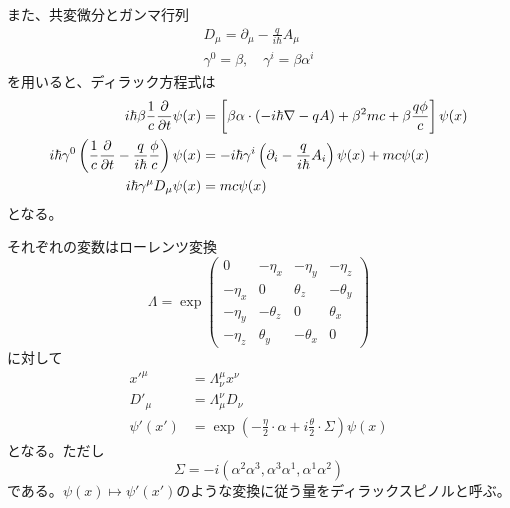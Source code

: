     また、共変微分とガンマ行列
    \begin{gather*}
        D_\mu = \partial_\mu - \frac{q}{i\hbar}A_\mu\\
        \gamma^0 = \beta, \quad \gamma^i = \beta\alpha^i
    \end{gather*}
    を用いると、ディラック方程式は
    \begin{align*}
        i\hbar\beta\frac{1}{c}\pdv{t}\psi(x) &= \left[\beta\alpha \cdot (-i\hbar\nabla - qA) + \beta^2 mc + \beta\frac{q\phi}{c}\right]\psi(x)\\
        i\hbar\gamma^0\left(\frac{1}{c}\pdv{t} - \frac{q}{i\hbar}\frac{\phi}{c}\right)\psi(x) &= -i\hbar\gamma^i \left(\partial_i - \frac{q}{i\hbar}A_i\right)\psi(x) + mc\psi(x)\\
        i\hbar \gamma^\mu D_\mu \psi(x) &= mc\psi(x)
    \end{align*}
    となる。

    それぞれの変数はローレンツ変換
        \[\Lambda = \exp \begin{pmatrix}
            0 & -\eta_x & -\eta_y & -\eta_z\\
            -\eta_x & 0 & \theta_z & -\theta_y\\
            -\eta_y & -\theta_z & 0 & \theta_x\\
            -\eta_z & \theta_y & -\theta_x & 0
        \end{pmatrix}\]
    に対して
    \begin{align*}
        x'^\mu &= \Lambda^\mu_\nu x^\nu\\
        D'_\mu &= \Lambda_\mu^\nu D_\nu\\
        \psi'(x') &= \exp\left(-\frac{\eta}{2} \cdot \alpha + i\frac{\theta}{2} \cdot \Sigma\right)\psi(x)
    \end{align*}
    となる。ただし
        \[\Sigma = -i(\alpha^2\alpha^3, \alpha^3\alpha^1, \alpha^1\alpha^2)\]
    である。$\psi(x) \mapsto \psi'(x')$のような変換に従う量をディラックスピノルと呼ぶ。

